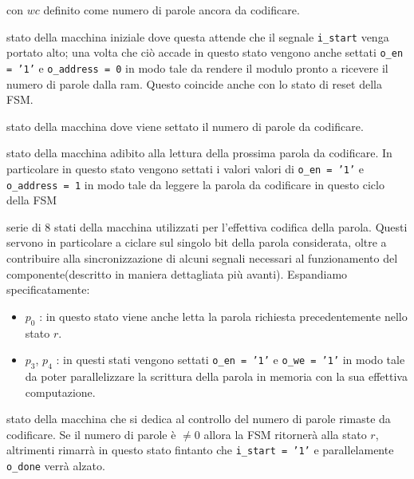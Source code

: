 \documentclass[11pt,a4paper]{article}
\begin{document}
                con $wc$ definito come numero di parole ancora da codificare.
                \begin{description}[leftmargin = 0cm]
                    \item[Idle - $idle$ : ] stato della macchina iniziale dove questa attende che il segnale \texttt{i\_start} venga portato alto; una volta che ciò accade in questo stato vengono anche settati \texttt{o\_en = '1'} e \texttt{o\_address = 0} in modo tale da rendere il modulo pronto a ricevere il numero di parole dalla ram. Questo coincide anche con lo stato di reset della FSM.
                    \item[Read word count - $r_{wc}$ : ] stato della macchina dove viene settato il numero di parole da codificare.
                    \item[Read word - $r$ : ] stato della macchina adibito alla lettura della prossima parola da codificare. In particolare in questo stato vengono settati i valori valori di \texttt{o\_en = '1'} e \texttt{o\_address = 1} in modo tale da leggere la parola da codificare in questo ciclo della FSM
                    \item[Process - $p_0 \rightarrow p_7$ : ] serie di 8 stati della macchina utilizzati per l'effettiva codifica della parola. Questi servono in particolare a ciclare sul singolo bit della parola considerata, oltre a contribuire alla sincronizzazione di alcuni segnali necessari al funzionamento del componente(descritto in maniera dettagliata più avanti). Espandiamo specificatamente:
                    \begin{itemize}
                        \item $p_0$ : in questo stato viene anche letta la parola richiesta precedentemente nello stato $r$.
                        \item $p_3$, $p_4$ : in questi stati vengono settati \texttt{o\_en = '1'} e \texttt{o\_we = '1'} in modo tale da poter parallelizzare la scrittura della parola in memoria con la sua effettiva computazione.
                    \end{itemize}
                    \item[Done - $d$ : ] stato della macchina che si dedica al controllo del numero di parole rimaste da codificare. Se il numero di parole è $\neq 0$ allora la FSM ritornerà alla stato $r$, altrimenti rimarrà in questo stato fintanto che \texttt{i\_start = '1'} e parallelamente \texttt{o\_done} verrà alzato.
                \end{description}
\end{document}
